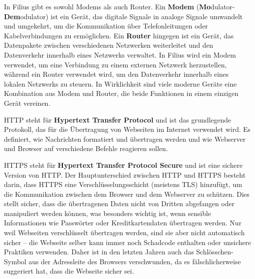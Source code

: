 \begin{myremark}
	In Filius gibt es sowohl Modems als auch Router. Ein \textbf{Modem} (\textbf{Mo}dulator-\textbf{Dem}odulator) ist ein Gerät, das digitale Signale in analoge Signale umwandelt und umgekehrt, um die Kommunikation über Telefonleitungen oder Kabelverbindungen zu ermöglichen. Ein \textbf{Router} hingegen ist ein Gerät, das Datenpakete zwischen verschiedenen Netzwerken weiterleitet und den Datenverkehr innerhalb eines Netzwerks verwaltet. In Filius wird ein Modem verwendet, um eine Verbindung zu einem externen Netzwerk herzustellen, während ein Router verwendet wird, um den Datenverkehr innerhalb eines lokalen Netzwerks zu steuern. In Wirklichkeit sind viele moderne Geräte eine Kombination aus Modem und Router, die beide Funktionen in einem einzigen Gerät vereinen.
\end{myremark}

\begin{myremark}
	\gls{HTTP} steht für \textbf{Hypertext Transfer Protocol} und ist das grundlegende Protokoll, das für die Übertragung von Webseiten im Internet verwendet wird. Es definiert, wie Nachrichten formatiert und übertragen werden und wie Webserver und Browser auf verschiedene Befehle reagieren sollen.

	\gls{HTTPS} steht für \textbf{Hypertext Transfer Protocol Secure} und ist eine sichere Version von \gls{HTTP}. Der Hauptunterschied zwischen \gls{HTTP} und \gls{HTTPS} besteht darin, dass \gls{HTTPS} eine Verschlüsselungsschicht (meistens \gls{TLS}) hinzufügt, um die Kommunikation zwischen dem Browser und dem Webserver zu schützen. Dies stellt sicher, dass die übertragenen Daten nicht von Dritten abgefangen oder manipuliert werden können, was besonders wichtig ist, wenn sensible Informationen wie Passwörter oder Kreditkartendaten übertragen werden. Nur weil Webseiten verschlüsselt übertragen werden, sind sie aber nicht automatisch sicher -- die Webseite selber kann immer noch Schadcode enthalten oder unsichere Praktiken verwenden. Daher ist in den letzten Jahren auch das Schlösschen-Symbol aus der Adressleite des Browsers verschwunden, da es fälschlicherweise suggeriert hat, dass die Webseite sicher sei.
\end{myremark}

